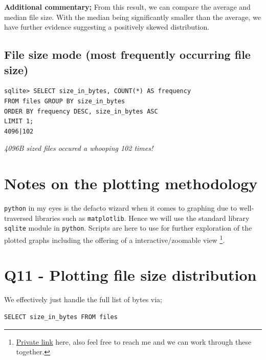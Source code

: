 \documentclass{article}
\begin{document}
\textbf{Additional commentary;} From this result, we can compare the average and median file size. With the median being significantly smaller than the average, we have further evidence suggesting a positively skewed distribution.

\subsection*{File size mode (most frequently occurring file size)}
\begin{small}
\begin{verbatim}
sqlite> SELECT size_in_bytes, COUNT(*) AS frequency
FROM files GROUP BY size_in_bytes
ORDER BY frequency DESC, size_in_bytes ASC
LIMIT 1;
4096|102
\end{verbatim}
\end{small}
\textit{4096B sized files occured a whooping 102 times!}

\section*{Notes on the plotting methodology}
\texttt{python} in my eyes is the defacto wizard when it comes to graphing due to well-traversed libraries such as \texttt{matplotlib}. Hence we will use the standard library \texttt{sqlite} module in \texttt{python}. Scripts are here to use for further exploration of the plotted graphs including the offering of a interactive/zoomable view \footnote{\href{https://gitfront.io/r/user-5047466/ZFVr4eV9CukU/cs742-published-scripts/}{Private link} here, also feel free to reach me and we can work through these together.}.

\section*{Q11 - Plotting file size distribution}
We effectively just handle the full list of bytes via;

\begin{small}
\begin{verbatim}
SELECT size_in_bytes FROM files
\end{verbatim}
\end{small}
\end{document}
